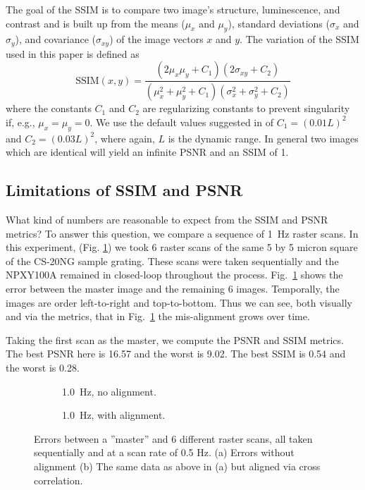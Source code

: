 \documentclass[twocolumn,oneside]{IEEEtran/IEEEtran}
\begin{document}
The goal of the SSIM is to compare two image's structure, luminescence, and contrast and is built up from the means ($\mu_x$ and $\mu_y$), standard deviations ($\sigma_x$ and $\sigma_y$), and covariance ($\sigma_{xy}$) of the image vectors $x$ and $y$.  
The variation of the SSIM used in this paper is defined as
\begin{equation*}
  \text{SSIM}(x,y) = \frac{(2\mu_x\mu_y + C_1)(2\sigma_{xy}+C_2)}
  {(\mu_x^2 + \mu_y^2 + C_1)(\sigma_x^2 + \sigma_y^2 + C_2)}
\end{equation*}
where the constants $C_1$ and $C_2$ are regularizing constants to prevent singularity if, e.g., $\mu_x=\mu_y=0$.
We use the default values suggested in \cite{wang_image_2004} of $C_1=(0.01L)^2$ and ${C_2=(0.03L)^2}$, where again, $L$ is the dynamic range.
In general two images which are identical will yield an infinite PSNR and an SSIM of 1.

\subsection{Limitations of SSIM and PSNR}\label{sec:limits}
What kind of numbers are reasonable to expect from the SSIM and PSNR metrics?
To answer this question, we compare a sequence of 1~Hz raster scans.
In this experiment, (Fig. \ref{fig:rast_unaligned_1}) we took 6 raster scans of the same 5 by 5 micron
square of the CS-20NG sample grating. These scans were taken sequentially and
the NPXY100A remained in closed-loop throughout the process.
Fig.~\ref{fig:rast_unaligned_1} shows the error between the master
image and the remaining 6 images.
Temporally, the images are order left-to-right and top-to-bottom.
Thus we can see, both visually and via the metrics, that in Fig.~\ref{fig:rast_unaligned_1} the mis-alignment
grows over time. 

Taking the first scan as the master, we compute the PSNR and SSIM
metrics. The best PSNR here is 16.57 and the worst is 9.02.
The best SSIM is 0.54 and the worst is 0.28.

\begin{figure}[t!]
  \begin{subfigure}{.48\textwidth}
    
    \caption{1.0~Hz, no alignment.}
    \label{fig:rast_unaligned_1}
  \end{subfigure}
  \hfill
  \begin{subfigure}{.48\textwidth}
    
    \caption{1.0~Hz, with alignment.}
    \label{fig:rast_aligned_1}
  \end{subfigure}
% 
  \caption{Errors between a ''master'' and 6 different raster scans, all taken
    sequentially and at a scan rate of 0.5 Hz. (a) Errors without alignment (b)
    The same data as above in (a) but aligned via cross correlation.}
  \label{fig:baseline_errors}
\end{figure}
\end{document}
